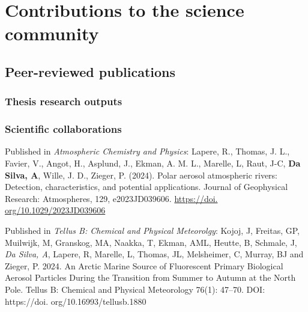 \newpage
\thispagestyle{empty}
\mbox{}
\newpage


\chapter{Contributions to the science community}

\section*{Peer-reviewed publications}
    \subsection*{Thesis research outputs}



    \subsection*{Scientific collaborations}
    Published in \textit{Atmospheric Chemistry and Physics}:
    Lapere, R., Thomas, J. L., Favier, V., Angot, H., Asplund, J., Ekman, A. M. L., Marelle, L, Raut, J-C, \textbf{Da Silva, A}, Wille, J. D., Zieger, P. (2024). Polar aerosol atmospheric rivers: Detection, characteristics, and potential applications. Journal of  Geophysical Research: Atmospheres, 129, e2023JD039606. \url{https://doi. org/10.1029/2023JD039606}

    Published in \textit{Tellus B: Chemical and Physical Meteorolgy}:
    Kojoj, J, Freitas, GP, Muilwijk, M, Granskog, MA, Naakka, T, Ekman, AML, Heutte, B, Schmale, J, \textit{Da Silva, A}, Lapere, R, Marelle, L, Thomas, JL, Melsheimer, C, Murray, BJ and Zieger, P. 2024. An Arctic Marine Source of Fluorescent Primary Biological Aerosol Particles During the Transition from Summer to Autumn at the North Pole. Tellus B: Chemical and Physical Meteorology  76(1): 47–70. DOI: https://doi. org/10.16993/tellusb.1880
